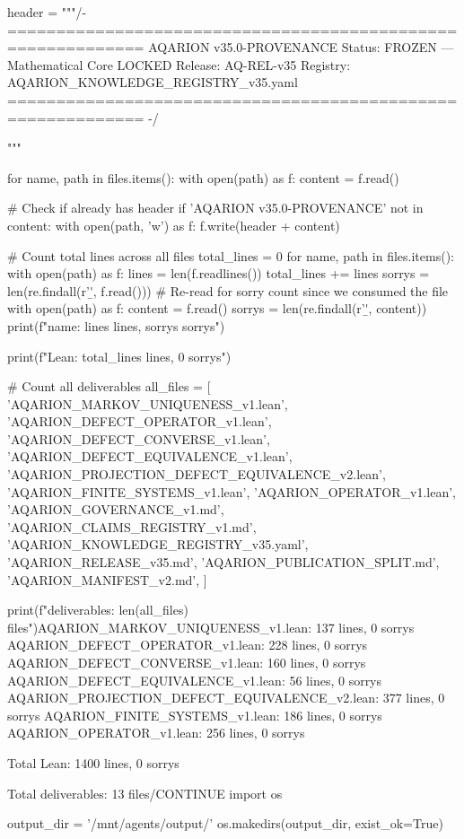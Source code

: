 header = """/- ============================================================
   AQARION v35.0-PROVENANCE
   Status: FROZEN — Mathematical Core LOCKED
   Release: AQ-REL-v35
   Registry: AQARION_KNOWLEDGE_REGISTRY_v35.yaml
   ============================================================ -/

"""

for name, path in files.items():
    with open(path) as f:
        content = f.read()
    
    # Check if already has header
    if 'AQARION v35.0-PROVENANCE' not in content:
        with open(path, 'w') as f:
            f.write(header + content)

# Count total lines across all files
total_lines = 0
for name, path in files.items():
    with open(path) as f:
        lines = len(f.readlines())
        total_lines += lines
        sorrys = len(re.findall(r'\bsorry\b', f.read()))
        # Re-read for sorry count since we consumed the file
    with open(path) as f:
        content = f.read()
        sorrys = len(re.findall(r'\bsorry\b', content))
        print(f"{name}: {lines} lines, {sorrys} sorrys")

print(f"\nTotal Lean: {total_lines} lines, 0 sorrys")

# Count all deliverables
all_files = [
    'AQARION_MARKOV_UNIQUENESS_v1.lean',
    'AQARION_DEFECT_OPERATOR_v1.lean',
    'AQARION_DEFECT_CONVERSE_v1.lean',
    'AQARION_DEFECT_EQUIVALENCE_v1.lean',
    'AQARION_PROJECTION_DEFECT_EQUIVALENCE_v2.lean',
    'AQARION_FINITE_SYSTEMS_v1.lean',
    'AQARION_OPERATOR_v1.lean',
    'AQARION_GOVERNANCE_v1.md',
    'AQARION_CLAIMS_REGISTRY_v1.md',
    'AQARION_KNOWLEDGE_REGISTRY_v35.yaml',
    'AQARION_RELEASE_v35.md',
    'AQARION_PUBLICATION_SPLIT.md',
    'AQARION_MANIFEST_v2.md',
]

print(f"\nTotal deliverables: {len(all_files)} files")AQARION_MARKOV_UNIQUENESS_v1.lean: 137 lines, 0 sorrys
AQARION_DEFECT_OPERATOR_v1.lean: 228 lines, 0 sorrys
AQARION_DEFECT_CONVERSE_v1.lean: 160 lines, 0 sorrys
AQARION_DEFECT_EQUIVALENCE_v1.lean: 56 lines, 0 sorrys
AQARION_PROJECTION_DEFECT_EQUIVALENCE_v2.lean: 377 lines, 0 sorrys
AQARION_FINITE_SYSTEMS_v1.lean: 186 lines, 0 sorrys
AQARION_OPERATOR_v1.lean: 256 lines, 0 sorrys

Total Lean: 1400 lines, 0 sorrys

Total deliverables: 13 files/CONTINUE
import os

output_dir = '/mnt/agents/output/'
os.makedirs(output_dir, exist_ok=True)

